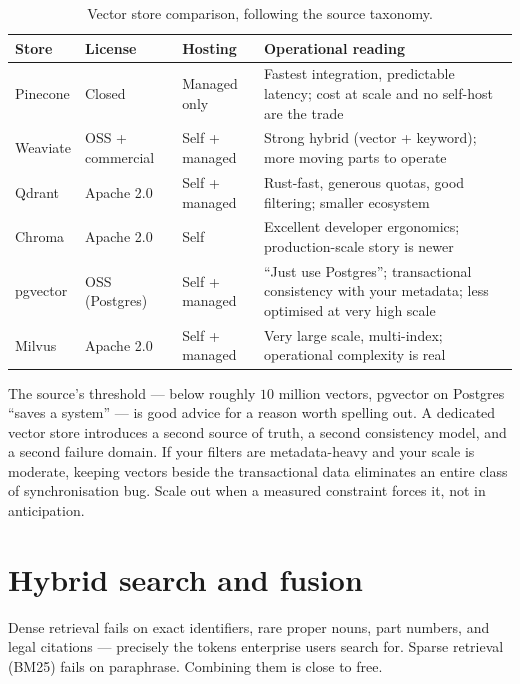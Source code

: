 \documentclass[11pt,twoside,openright]{book}
\theoremstyle{definition}
\theoremstyle{plain}
\theoremstyle{remark}
\begin{document}
\begin{table}[H]
\centering\footnotesize
\renewcommand{\arraystretch}{1.3}
\begin{tabularx}{\textwidth}{@{}l l l X@{}}
\toprule
\textbf{Store} & \textbf{License} & \textbf{Hosting} & \textbf{Operational reading} \\
\midrule
Pinecone & Closed & Managed only &
  Fastest integration, predictable latency; cost at scale and no self-host are the trade \\
Weaviate & OSS + commercial & Self + managed &
  Strong hybrid (vector + keyword); more moving parts to operate \\
Qdrant & Apache 2.0 & Self + managed &
  Rust-fast, generous quotas, good filtering; smaller ecosystem \\
Chroma & Apache 2.0 & Self &
  Excellent developer ergonomics; production-scale story is newer \\
pgvector & OSS (Postgres) & Self + managed &
  ``Just use Postgres''; transactional consistency with your metadata; less optimised at very high scale \\
Milvus & Apache 2.0 & Self + managed &
  Very large scale, multi-index; operational complexity is real \\
\bottomrule
\end{tabularx}
\caption{Vector store comparison, following the source taxonomy.}
\label{tab:vecdb}
\end{table}

\begin{keyidea}
The source's threshold --- below roughly $10$ million vectors, pgvector on
Postgres ``saves a system'' --- is good advice for a reason worth spelling out.
A dedicated vector store introduces a second source of truth, a second
consistency model, and a second failure domain. If your filters are
metadata-heavy and your scale is moderate, keeping vectors beside the
transactional data eliminates an entire class of synchronisation bug. Scale out
when a measured constraint forces it, not in anticipation.
\end{keyidea}

\section{Hybrid search and fusion}

Dense retrieval fails on exact identifiers, rare proper nouns, part numbers, and
legal citations --- precisely the tokens enterprise users search for. Sparse
retrieval (BM25) fails on paraphrase. Combining them is close to free.
\end{document}
